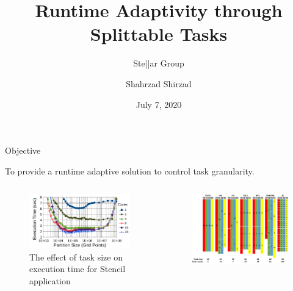 \documentclass[10pt]{beamer}
\title{Runtime Adaptivity through Splittable Tasks}
\subtitle{Ste||ar Group}
\author{Shahrzad Shirzad}
\date{July 7, 2020}
\institute{Louisiana State University}
\begin{document}


\maketitle



\begin{frame}{Objective}
	\begin{outline}
		To provide a runtime adaptive solution to control task granularity. 
		\begin{columns}
			\begin{figure}
				\centering
				\includegraphics[scale=.22]{images/task_granularity.png}
				\caption{The effect of task size on execution time for Stencil application}			
			\end{figure}				
		\begin{figure}
			\centering
			\includegraphics[width=0.8\linewidth]{images/loop_1.png}

\end{figure}
\end{columns}
\end{outline}
\end{frame}
\end{document}
